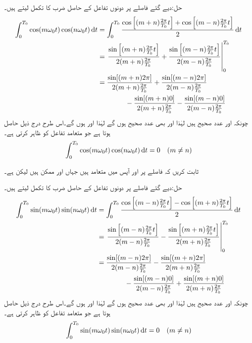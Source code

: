 حل:دیے گئے فاصلے پر دونوں تفاعل کے حاصل ضرب کا تکمل لیتے ہیں۔
\begin{align*}
\int_0^{T_0} \cos (m\omega_0 t) \cos (n\omega_0 t) \dif t&=\int_0^{T_0} \frac{\cos\left[(m+n)\frac{2\pi}{T_0} t\right]+\cos\left[(m-n)\frac{2\pi}{T_0} t\right]}{2}\dif t\\
&=\left.\frac{\sin\left[(m+n)\frac{2\pi}{T_0} t\right]}{2(m+n)\frac{2\pi}{T_0} }+\frac{\sin\left[(m-n)\frac{2\pi}{T_0} t\right]}{2(m-n)\frac{2\pi}{T_0} }\right|_0^{T_0}\\
&=\frac{\sin[(m+n)2\pi]}{2(m+n)\frac{2\pi}{T_0} }+\frac{\sin[(m-n)2\pi]}{2(m-n)\frac{2\pi}{T_0} }\\
&\quad \quad \quad \quad -\frac{\sin[(m+n)0]}{2(m+n)\frac{2\pi}{T_0} }-\frac{\sin[(m-n)0]}{2(m-n)\frac{2\pi}{T_0} }
\end{align*}
چونکہ  اور  عدد صحیح ہیں لہٰذا  اور  بھی عدد صحیح ہوں گے لہٰذا  اور   ہوں گے۔اس طرح درج ذیل حاصل ہوتا ہے جو متعامد تفاعل کو ظاہر کرتی ہے۔
\begin{align}\label{مساوات_فوریئر_مختلف_تکمل_الف}
\int_0^{T_0} \cos (m\omega_0 t) \cos (n\omega_0 t) \dif t=0\quad (m\ne n)
\end{align}

ثابت کریں کہ  فاصلے پر  اور  آپس میں متعامد ہیں جہاں  اور  ممکن ہیں لیکن  ہے۔

حل:دیے گئے فاصلے پر دونوں تفاعل کے حاصل ضرب کا تکمل لیتے ہیں۔
\begin{align*}
\int_0^{T_0} \sin (m\omega_0 t) \sin (n\omega_0 t) \dif t&=\int_0^{T_0} \frac{\cos\left[(m-n)\frac{2\pi}{T_0} t\right]-\cos\left[(m+n)\frac{2\pi}{T_0} t\right]}{2}\dif t\\
&=\left.\frac{\sin\left[(m-n)\frac{2\pi}{T_0} t\right]}{2(m-n)\frac{2\pi}{T_0} }-\frac{\sin\left[(m+n)\frac{2\pi}{T_0} t\right]}{2(m+n)\frac{2\pi}{T_0} }\right|_0^{T_0}\\
&=\frac{\sin[(m-n)2\pi]}{2(m-n)\frac{2\pi}{T_0} }-\frac{\sin[(m+n)2\pi]}{2(m+n)\frac{2\pi}{T_0} }\\
&\quad \quad \quad \quad -\frac{\sin[(m-n)0]}{2(m-n)\frac{2\pi}{T_0} }+\frac{\sin[(m+n)0]}{2(m+n)\frac{2\pi}{T_0} }
\end{align*}
چونکہ  اور  عدد صحیح ہیں لہٰذا  اور  بھی عدد صحیح ہوں گے لہٰذا  اور   ہوں گے۔اس طرح درج ذیل حاصل ہوتا ہے جو متعامد تفاعل کو ظاہر کرتی ہے۔
\begin{align}\label{مساوات_فوریئر_مختلف_تکمل_ب}
\int_0^{T_0} \sin (m\omega_0 t) \sin (n\omega_0 t) \dif t=0\quad (m\ne n)
\end{align}

